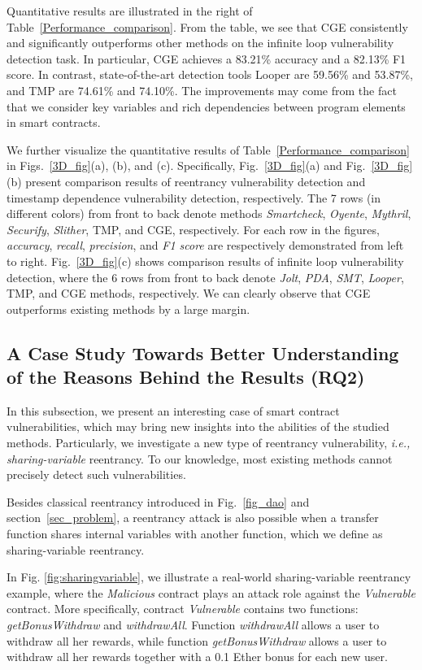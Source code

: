 Quantitative results are illustrated in the right of Table~\ref{Performance_comparison}. From the table, we see that CGE consistently and significantly outperforms other methods on the infinite loop vulnerability detection task. In particular, CGE achieves a 83.21\% accuracy and a 82.13\% F1 score. In contrast, state-of-the-art detection tools Looper are 59.56\% and 53.87\%, and TMP are 74.61\% and 74.10\%. The improvements may come from the fact that we consider key variables and rich dependencies between program elements in smart contracts. 

We further visualize the quantitative results of Table~\ref{Performance_comparison} in Figs.~\ref{3D_fig}(a), (b), and (c). Specifically, Fig.~\ref{3D_fig}(a) and Fig.~\ref{3D_fig}(b) present comparison results of reentrancy vulnerability detection and timestamp dependence vulnerability detection, respectively. The 7 rows (in different colors) from front to back denote methods \textit{Smartcheck}, \textit{Oyente}, \textit{Mythril}, \textit{Securify}, \textit{Slither}, TMP, and CGE, respectively. For each row in the figures, \emph{accuracy}, \emph{recall}, \emph{precision}, and \emph{F1 score} are respectively demonstrated from left to right. Fig.~\ref{3D_fig}(c) shows comparison results of infinite loop vulnerability detection, where the 6 rows from front to back denote \textit{Jolt}, \textit{PDA}, \textit{SMT}, \textit{Looper}, TMP, and CGE methods, respectively. We can clearly observe that CGE outperforms existing methods by a large margin.

\vspace{-0.7em}
\subsection{A Case Study Towards Better Understanding of the Reasons Behind the Results (RQ2)}
In this subsection, we present an interesting case of smart contract vulnerabilities, which may bring new insights into the abilities of the studied methods. Particularly, we investigate a new type of reentrancy vulnerability, \emph{i.e., sharing-variable} reentrancy. To our knowledge, most existing methods cannot precisely detect such vulnerabilities.

Besides classical reentrancy introduced in Fig.~\ref{fig_dao} and section~\ref{sec_problem}, a reentrancy attack is also possible when a transfer function shares internal variables with another function, which we define as sharing-variable reentrancy.

In Fig. \ref{fig:sharingvariable}, we illustrate a real-world sharing-variable reentrancy example, where the \emph{Malicious} contract plays an attack role against the \emph{Vulnerable} contract. More specifically, contract \emph{Vulnerable} contains two functions: \emph{getBonusWithdraw} and \emph{withdrawAll}. Function \emph{withdrawAll} allows a user to withdraw all her rewards, while function \emph{getBonusWithdraw} allows a user to withdraw all her rewards together with a 0.1 Ether bonus for each new user. 

